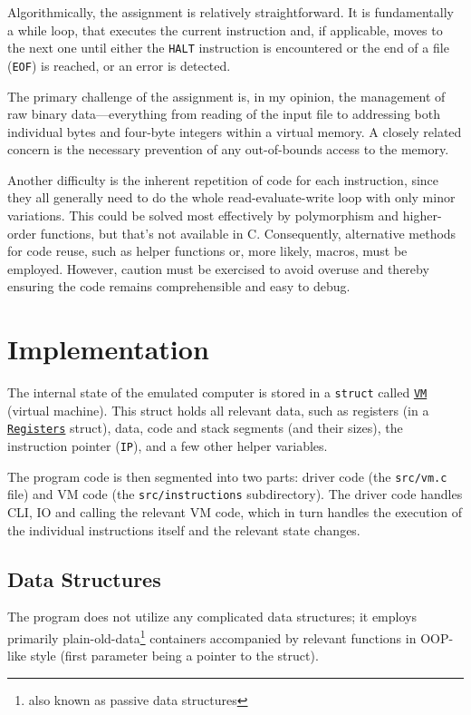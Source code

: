 \documentclass[12pt,a4paper,final]{article}
\newcommand{\code}[1]{\texttt{#1}}
\begin{document}
Algorithmically, the assignment is relatively straightforward. It is
fundamentally a while loop, that executes the current instruction and, if
applicable, moves to the next one until either the \code{HALT} instruction is
encountered or the end of a file (\code{EOF}) is reached, or an error is
detected.

The primary challenge of the assignment is, in my opinion, the management of raw
binary data---everything from reading of the input file to addressing both
individual bytes and four-byte integers within a virtual memory. A closely
related concern is the necessary prevention of any out-of-bounds access to the
memory.

Another difficulty is the inherent repetition of code for each instruction,
since they all generally need to do the whole read-evaluate-write loop with only
minor variations. This could be solved most effectively by polymorphism and
higher-order functions, but that's not available in C. Consequently, alternative
methods for code reuse, such as helper functions or, more likely, macros, must
be employed. However, caution must be exercised to avoid overuse and thereby
ensuring the code remains comprehensible and easy to debug.

\section{Implementation}
\label{sec:impl}

The internal state of the emulated computer is stored in a \code{struct} called
\hyperlink{vm}{\code{VM}} (virtual machine). This struct holds all relevant
data, such as registers (in a \hyperlink{registers}{\code{Registers}} struct),
data, code and stack segments (and their sizes), the instruction pointer
(\code{IP}), and a few other helper variables.

The program code is then segmented into two parts: driver code (the
\code{src/vm.c} file) and VM code (the \code{src/instructions} subdirectory).
The driver code handles CLI, IO and calling the relevant VM code, which in turn
handles the execution of the individual instructions itself and the relevant
state changes. 

\subsection{Data Structures}

The program does not utilize any complicated data structures; it employs
primarily plain-old-data\footnote{also known as passive data structures}
containers accompanied by relevant functions in OOP-like style (first parameter
being a pointer to the struct).
\end{document}
